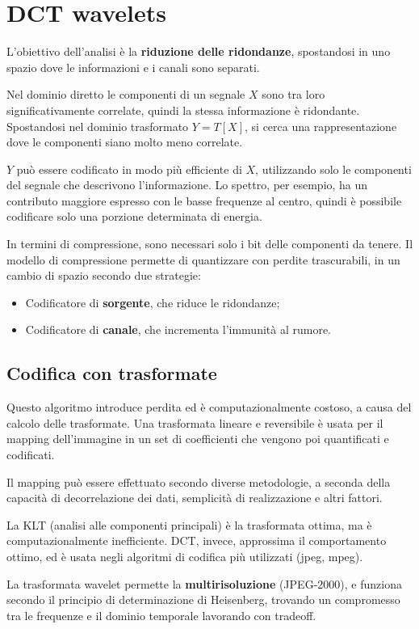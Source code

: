 \section{DCT wavelets}
L'obiettivo dell'analisi è la \textbf{riduzione delle ridondanze}, spostandosi in uno spazio dove le informazioni e i canali sono separati. 

Nel dominio diretto le componenti di un segnale $X$ sono tra loro significativamente correlate, quindi la stessa informazione è ridondante. Spostandosi nel dominio trasformato $Y = T[X]$, si cerca una rappresentazione dove le componenti siano molto meno correlate.

$Y$ può essere codificato in modo più efficiente di $X$, utilizzando solo le componenti del segnale che descrivono l'informazione. Lo spettro, per esempio, ha un contributo maggiore espresso con le basse frequenze al centro, quindi è possibile codificare solo una porzione determinata di energia.

In termini di compressione, sono necessari solo i bit delle componenti da tenere. Il modello di compressione permette di quantizzare con perdite trascurabili, in un cambio di spazio secondo due strategie:
\begin{itemize}
	\item Codificatore di \textbf{sorgente}, che riduce le ridondanze;
	\item Codificatore di \textbf{canale}, che incrementa l'immunità al rumore.
\end{itemize}

\subsection{Codifica con trasformate}
Questo algoritmo introduce perdita ed è computazionalmente costoso, a causa del calcolo delle trasformate. Una trasformata lineare e reversibile è usata per il mapping dell'immagine in un set di coefficienti che vengono poi quantificati e codificati.

Il mapping può essere effettuato secondo diverse metodologie, a seconda della capacità di decorrelazione dei dati, semplicità di realizzazione e altri fattori.

La KLT (analisi alle componenti principali) è la trasformata ottima, ma è computazionalmente inefficiente. DCT, invece, approssima il comportamento ottimo, ed è usata negli algoritmi di codifica più utilizzati (jpeg, mpeg).

La trasformata wavelet permette la \textbf{multirisoluzione} (JPEG-2000), e funziona secondo il principio di determinazione di Heisenberg, trovando un compromesso tra le frequenze e il dominio temporale lavorando con tradeoff.

